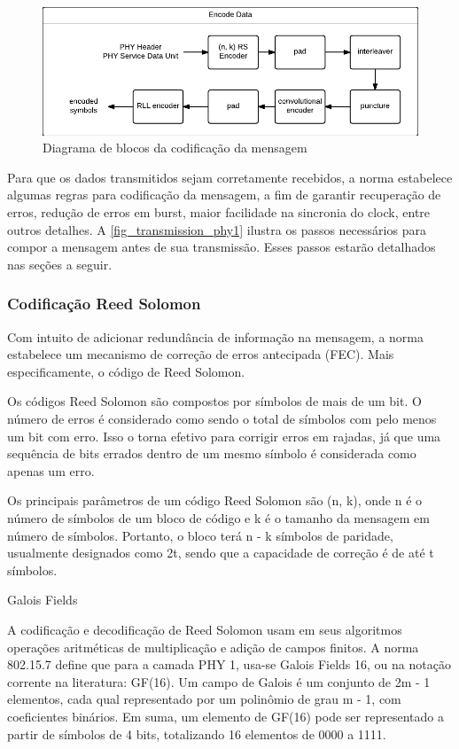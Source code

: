 		\begin{figure}[htb]
			\caption{\label{fig_transmission_phy1} Diagrama de blocos da codificação da mensagem}
			\centering
			\includegraphics[width=0.6\textheight]{PHY1-transmission.pdf}
		\end{figure}
		
	Para que os dados transmitidos sejam corretamente recebidos, a norma estabelece algumas regras para codificação da mensagem, a fim de garantir recuperação de erros, redução de erros em burst, maior facilidade na sincronia do clock, entre outros detalhes. A \autoref{fig_transmission_phy1} ilustra os passos necessários para compor a mensagem antes de sua transmissão. Esses passos estarão detalhados nas seções a seguir.
	
	\subsubsection{Codificação Reed Solomon}
	
	Com intuito de adicionar redundância de informação na mensagem, a norma estabelece um mecanismo de correção de erros antecipada (FEC). Mais especificamente, o código de Reed Solomon. 
	
	Os códigos Reed Solomon são compostos por símbolos de mais de um bit. O número de erros é considerado como sendo o total de símbolos com pelo menos um bit com erro. Isso o torna efetivo para corrigir erros em rajadas, já que uma sequência de bits errados dentro de um mesmo símbolo é considerada como apenas um erro. 
	
	Os principais parâmetros de um código Reed Solomon são (n, k), onde n é o número de símbolos de um bloco de código e k é o tamanho da mensagem em número de símbolos. Portanto, o bloco terá n - k símbolos de paridade, usualmente designados como 2t, sendo que a capacidade de correção é de até t símbolos.
	
	Galois Fields
	
	A codificação e decodificação de Reed Solomon usam em seus algoritmos operações aritméticas de multiplicação e adição de campos finitos. A norma 802.15.7 define que para a camada PHY 1, usa-se Galois Fields 16, ou na notação corrente na literatura: GF(16). Um campo de Galois é um conjunto de 2m - 1 elementos, cada qual representado por um polinômio de grau m - 1, com coeficientes binários. Em suma, um elemento de GF(16) pode ser representado a partir de símbolos de 4 bits, totalizando 16 elementos de 0000 a 1111. 
	
